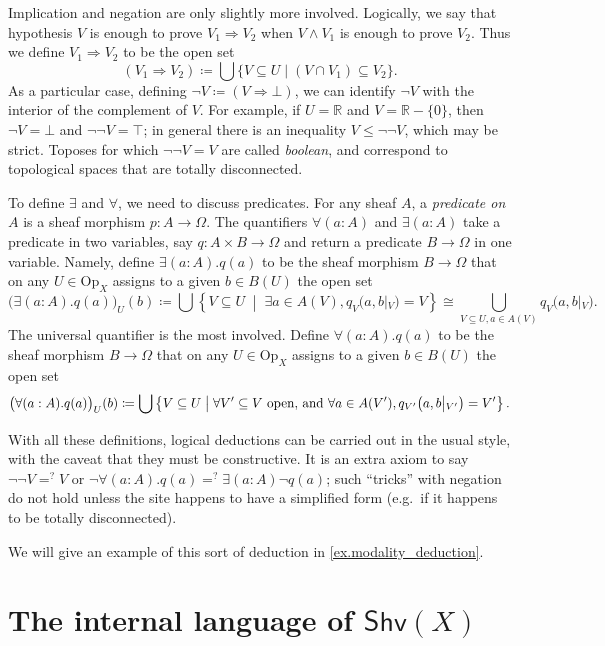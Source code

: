 \documentclass[11pt, oneside, article]{memoir}
\theoremstyle{plain}
\theoremstyle{definition}
\theoremstyle{remark}
\renewcommand{\ss}{\subseteq}
\newcommand{\Set}[1]{\mathrm{#1}}
\newcommand{\Fun}[1]{\mathsf{#1}}
\newcommand{\tn}[1]{\textnormal{#1}}
\newcommand{\rr}{\mathbb{R}}
\newcommand{\shv}{\Fun{Shv}}
\newcommand{\Op}{\Set{Op}}
\newcommand{\rest}[2]{#1\big|\hspace{0in}_{#2}}
\newcommand{\imp}{\Rightarrow}
\newcommand{\true}{\top}
\newcommand{\false}{\bot}
\begin{document}
Implication and negation are only slightly more involved. Logically, we say that hypothesis $V$ is enough to prove $V_1\imp V_2$ when $V\wedge V_1$ is enough to prove $V_2$. Thus we define $V_1\imp V_2$ to be the open set
\begin{equation}\label{eqn.implication}
	(V_1\imp V_2)\coloneqq\bigcup\{V\ss U\mid (V\cap V_1)\ss V_2\}.
\end{equation}
 As a particular case, defining $\neg V\coloneqq (V\imp \false)$, we can identify $\neg V$ with the interior of the complement of $V$. For example, if $U=\rr$ and $V=\rr-\{0\}$, then $\neg V=\false$ and $\neg\neg V=\true$; in general there is an inequality $V\leq\neg\neg V$, which may be strict. Toposes for which $\neg\neg V=V$ are called \emph{boolean}, and correspond to topological spaces that are totally disconnected.

To define $\exists$ and $\forall$, we need to discuss predicates. For any sheaf $A$, a \emph{predicate on $A$} is a sheaf morphism $p\colon A\to\Omega$. The quantifiers $\forall(a:A)$ and $\exists(a:A)$ take a predicate in two variables, say $q\colon A\times B\to\Omega$ and return a predicate $B\to\Omega$ in one variable. Namely, define $\exists(a:A).q(a)$ to be the sheaf morphism $B\to\Omega$ that on any $U\in\Op_X$ assigns to a given $b\in B(U)$ the open set
\[
\big(\exists(a:A).q(a)\big)_U(b)\coloneqq\bigcup\left\{V\ss U\;\middle|\;\exists a\in A(V), q_V\big(a,\rest{b}{V}\big)=V\right\}\cong\bigcup_{V\ss U,a\in A(V)}q_V\big(a,\rest{b}{V}\big).
\]
The universal quantifier is the most involved. Define $\forall(a:A).q(a)$ to be the sheaf morphism $B\to\Omega$ that on any $U\in\Op_X$ assigns to a given $b\in B(U)$ the open set
\[
\big(\forall(a:A).q(a)\big)_U(b)\coloneqq\bigcup\left\{V\ss U\;\middle|\;
\forall V'\ss V \tn{ open, and } \forall a\in A(V'), q_{V'}\big(a,\rest{b}{V'}\big)=V'\right\}.
\]

With all these definitions, logical deductions can be carried out in the usual style, with the caveat that they must be constructive. It is an extra axiom to say $\neg\neg V=^?V$ or $\neg\forall (a:A).q(a) =^? \exists (a:A)\neg q(a)$; such ``tricks'' with negation do not hold unless the site happens to have a simplified form (e.g.\ if it happens to be totally disconnected).

We will give an example of this sort of deduction in \cref{ex.modality_deduction}.

\section{The internal language of $\shv(X)$}\label{sec.internal_language}
\end{document}
